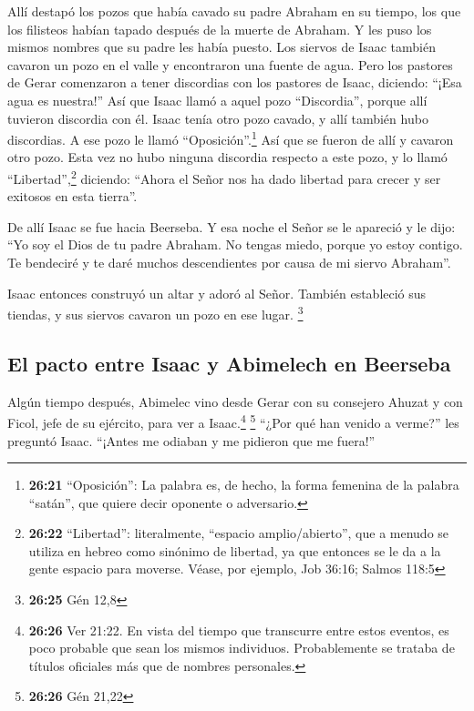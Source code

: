  Allí destapó los pozos que había cavado su padre Abraham
en su tiempo, los que los filisteos habían tapado después de la muerte
de Abraham. Y les puso los mismos nombres que su padre les había puesto.
 Los siervos de Isaac también cavaron un pozo en el valle
y encontraron una fuente de agua.  Pero los pastores de
Gerar comenzaron a tener discordias con los pastores de Isaac, diciendo:
``¡Esa agua es nuestra!'' Así que Isaac llamó a aquel pozo
``Discordia'', porque allí tuvieron discordia con él. 
Isaac tenía otro pozo cavado, y allí también hubo discordias. A ese pozo
le llamó ``Oposición''.\footnote{\textbf{26:21} ``Oposición'': La
  palabra es, de hecho, la forma femenina de la palabra ``satán'', que
  quiere decir oponente o adversario.}  Así que se fueron
de allí y cavaron otro pozo. Esta vez no hubo ninguna discordia respecto
a este pozo, y lo llamó ``Libertad'',\footnote{\textbf{26:22}
  ``Libertad'': literalmente, ``espacio amplio/abierto'', que a menudo
  se utiliza en hebreo como sinónimo de libertad, ya que entonces se le
  da a la gente espacio para moverse. Véase, por ejemplo, Job 36:16;
  Salmos 118:5} diciendo: ``Ahora el Señor nos ha dado libertad para
crecer y ser exitosos en esta tierra''.

 De allí Isaac se fue hacia Beerseba.  Y
esa noche el Señor se le apareció y le dijo: ``Yo soy el Dios de tu
padre Abraham. No tengas miedo, porque yo estoy contigo. Te bendeciré y
te daré muchos descendientes por causa de mi siervo Abraham''.

 Isaac entonces construyó un altar y adoró al Señor.
También estableció sus tiendas, y sus siervos cavaron un pozo en ese
lugar. \footnote{\textbf{26:25} Gén 12,8}

\hypertarget{el-pacto-entre-isaac-y-abimelech-en-beerseba}{%
\subsection{El pacto entre Isaac y Abimelech en
Beerseba}\label{el-pacto-entre-isaac-y-abimelech-en-beerseba}}

 Algún tiempo después, Abimelec vino desde Gerar con su
consejero Ahuzat y con Ficol, jefe de su ejército, para ver a
Isaac.\footnote{\textbf{26:26} Ver 21:22. En vista del tiempo que
  transcurre entre estos eventos, es poco probable que sean los mismos
  individuos. Probablemente se trataba de títulos oficiales más que de
  nombres personales.} \footnote{\textbf{26:26} Gén 21,22}
 ``¿Por qué han venido a verme?'' les preguntó Isaac.
``¡Antes me odiaban y me pidieron que me fuera!''

